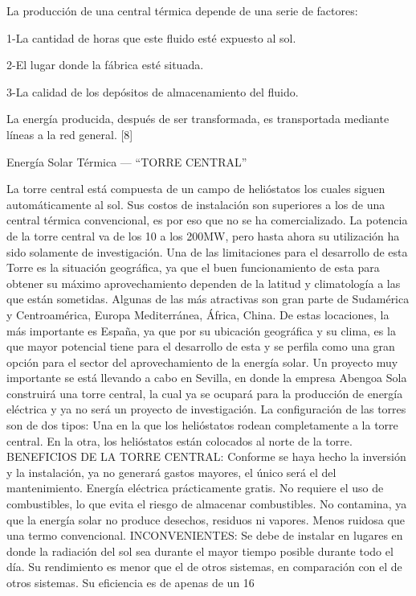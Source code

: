 \documentclass[12pt]{article}
\begin{document}
La producción de una central térmica depende de una serie de factores:

1-La cantidad de horas que este fluido esté expuesto al sol.

2-El lugar donde la fábrica esté situada.

3-La calidad de los depósitos de almacenamiento del fluido.

La energía producida, después de ser transformada, es transportada mediante líneas a la red general. [8]




Energía Solar Térmica — “TORRE CENTRAL”
 
La torre central está compuesta de un campo de helióstatos los cuales siguen automáticamente al sol.
Sus costos de instalación son superiores a los de una central térmica convencional, es por eso que no se ha comercializado.
La potencia de la torre central va de los 10 a los 200MW, pero hasta ahora su utilización ha sido solamente de investigación.
Una de las limitaciones para el desarrollo de esta Torre es la situación geográfica, ya que el buen funcionamiento de esta para obtener su máximo aprovechamiento dependen de la latitud y climatología a las que están sometidas.
Algunas de las más atractivas son gran parte de Sudamérica y Centroamérica, Europa Mediterránea, África, China.
De estas locaciones, la más importante es España, ya que por su ubicación geográfica y su clima, es la que mayor potencial tiene para el desarrollo de esta y se perfila como una gran opción para el sector del aprovechamiento de la energía solar.
Un proyecto muy importante se está llevando a cabo en Sevilla, en donde la empresa Abengoa Sola construirá una torre central, la cual ya se ocupará para la producción de energía eléctrica y ya no será un proyecto de investigación.
La configuración de las torres son de dos tipos:
Una en la que los helióstatos rodean completamente a la torre central.
En la otra, los helióstatos están colocados al norte de la torre.
BENEFICIOS DE LA TORRE CENTRAL:
Conforme se haya hecho la inversión y la instalación, ya no generará gastos mayores, el único será el del mantenimiento.
Energía eléctrica prácticamente gratis.
No requiere el uso de combustibles, lo que evita el riesgo de almacenar combustibles.
No contamina, ya que la energía solar no produce desechos, residuos ni vapores.
Menos ruidosa que una termo convencional.
INCONVENIENTES:
Se debe de instalar en lugares en donde la radiación del sol sea durante el mayor tiempo posible durante todo el día.
Su rendimiento es menor que el de otros sistemas, en comparación con el de otros sistemas. Su eficiencia es de apenas de un 16%
\end{document}
